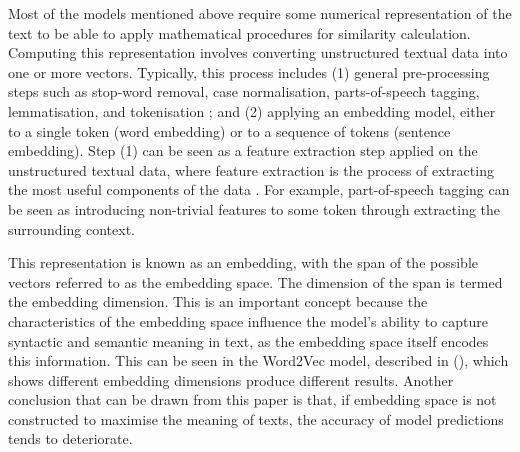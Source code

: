 \documentclass[10pt,oneside]{report}
\begin{document}
Most of the models mentioned above require some numerical representation of the text to be able to apply mathematical procedures for similarity calculation. Computing this representation involves converting unstructured textual data into one or more vectors. Typically, this process includes (1) general pre-processing steps such as stop-word removal, case normalisation, parts-of-speech tagging, lemmatisation, and tokenisation \cite{tabassum2020survey}; and (2) applying an embedding model, either to a single token (word embedding) or to a sequence of tokens (sentence embedding). Step (1) can be seen as a feature extraction step applied on the unstructured textual data, where feature extraction is the process of extracting the most useful components of the data \cite{sammons2016edison}. For example, part-of-speech tagging can be seen as introducing non-trivial features to some token through extracting the surrounding context. 

This representation is known as an embedding, with the span of the possible vectors referred to as the embedding space. The dimension of the span is termed the embedding dimension. This is an important concept because the characteristics of the embedding space influence the model's ability to capture syntactic and semantic meaning in text, as the embedding space itself encodes this information. This can be seen in the Word2Vec model, described in (\citet{bojanowski2017enriching}), which shows different embedding dimensions produce different results. Another conclusion that can be drawn from this paper is that, if embedding space is not constructed to maximise the meaning of texts, the accuracy of model predictions tends to deteriorate. 
\end{document}
